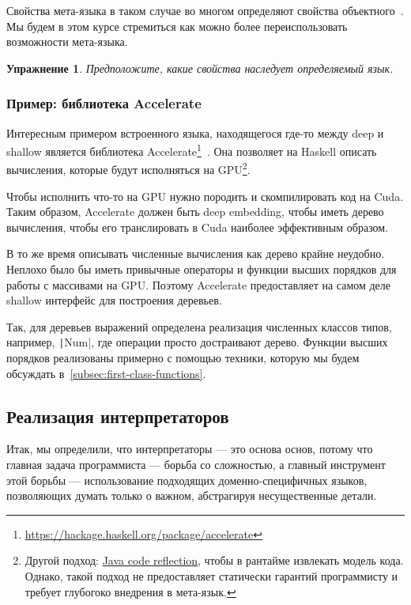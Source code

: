 \documentclass[12pt]{article}
\newtheorem{task}{Упражнение}
\begin{document}
    Свойства мета-языка в таком случае во многом определяют свойства объектного~\cite{reynolds1972definitional,reynolds1998definitional}.
    Мы будем в этом курсе стремиться как можно более переиспользовать возможности мета-языка.

    \begin{task}
        Предположите, какие свойства наследует определяемый язык.
    \end{task}

    \subsubsection{Пример: библиотека Accelerate}

    Интересным примером встроенного языка, находящегося где-то между deep и shallow является библиотека Accelerate\footnote{\url{https://hackage.haskell.org/package/accelerate}}~\cite[chapter 6]{marlow2011parallel}.
    Она позволяет на Haskell описать вычисления, которые будут исполняться на GPU\footnote{Другой подход: \href{https://youtu.be/6c0DB2kwF_Q?si=-nB7AkCsDWB_Q-hy}{Java code reflection}, чтобы в рантайме извлекать модель кода. Однако, такой подход не предоставляет статически гарантий программисту и требует глубогоко внедрения в мета-язык.}.

    Чтобы исполнить что-то на GPU нужно породить и скомпилировать код на Cuda.
    Таким образом, Accelerate должен быть deep embedding, чтобы иметь дерево вычисления, чтобы его транслировать в Cuda наиболее эффективным образом.

    В то же время описывать численные вычисления как дерево крайне неудобно.
    Неплохо было бы иметь привычные операторы и функции высших порядков для работы с массивами на GPU\@.
    Поэтому Accelerate предоставляет на самом деле shallow интерфейс для построения деревьев.

    Так, для деревьев выражений определена реализация численных классов типов, например, \texttt|Num|, где операции просто достраивают дерево.
    Функции высших порядков реализованы примерно с помощью техники, которую мы будем обсуждать в~\ref{subsec:first-class-functions}.


    \subsection{Реализация интерпретаторов}

    Итак, мы определили, что интерпретаторы --- это основа основ, потому что главная задача программиста --- борьба со сложностью, а главный инструмент этой борьбы --- использование подходящих доменно-специфичных языков, позволяющих думать только о важном, абстрагируя несущественные детали.
\end{document}
